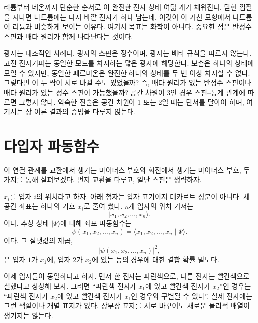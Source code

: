 리튬부터 네온까지 단순한 순서로 이 완전한 전자 상태 여덟 개가 채워진다. 닫힌 껍질을 지나면 나트륨에는 다시 바깥 전자가 하나 남는데, 이것이 이 거친 모형에서 나트륨이 리튬과 비슷하게 보이는 이유다. 여기서 목표는 화학이 아니다. 중요한 점은 반정수 스핀과 배타 원리가 함께 나타난다는 것이다.

광자는 대조적인 사례다. 광자의 스핀은 정수이며, 광자는 배타 규칙을 따르지 않는다. 고전 전자기파는 동일한 모드를 차지하는 많은 광자에 해당한다. 보손은 하나의 상태에 모일 수 있지만, 동일한 페르미온은 완전한 하나의 상태를 두 번 이상 차지할 수 없다. 그렇다면 이 두 짝이 서로 바뀔 수도 있었을까? 즉, 배타 원리가 없는 반정수 스핀이나 배타 원리가 있는 정수 스핀이 가능했을까? 공간 차원이 3인 경우 스핀--통계 관계에 따르면 그렇지 않다. 익숙한 진술은 공간 차원이 1 또는 2일 때는 단서를 달아야 하며, 여기서는 장 이론 결과의 증명을 다루지 않는다.

\begin{classroomqa}
\end{classroomqa}

\section{다입자 파동함수}

이 연결 관계를 교환에서 생기는 마이너스 부호와 회전에서 생기는 마이너스 부호, 두 가지를 통해 살펴보겠다. 먼저 교환을 다루고, 일단 스핀은 생략하자.

\(x_i\)를 입자 \(i\)의 위치라고 하자. 아래 첨자는 입자 표기이지 데카르트 성분이 아니다. 세 공간 좌표는 하나의 기호 \(x_i\)로 줄여 썼다. \(n\)개 입자의 위치 기저는
\begin{equation}
\lvert x_1,x_2,\ldots,x_n\rangle.
\end{equation}
이다. 추상 상태 \(\lvert\Psi\rangle\)에 대해 좌표 파동함수는
\begin{equation}
\psi(x_1,x_2,\ldots,x_n)
=
\langle x_1,x_2,\ldots,x_n\mid\Psi\rangle.
\end{equation}
이다. 그 절댓값의 제곱,
\begin{equation}
\bigl\lvert\psi(x_1,x_2,\ldots,x_n)\bigr\rvert^2,
\end{equation}
은 입자 \(1\)가 \(x_1\)에, 입자 \(2\)가 \(x_2\)에 있는 등의 경우에 대한 결합 확률 밀도다.

이제 입자들이 동일하다고 하자. 먼저 한 전자는 파란색으로, 다른 전자는 빨간색으로 칠했다고 상상해 보자. 그러면 ``파란색 전자가 \(x_1\)에 있고 빨간색 전자가 \(x_2\)''인 경우는 ``파란색 전자가 \(x_2\)에 있고 빨간색 전자가 \(x_1\)인 경우와 구별될 수 있다''. 실제 전자에는 그런 색깔이나 개별 표지가 없다. 장부상 표지를 서로 바꾸어도 새로운 물리적 배열이 생기지는 않는다.

